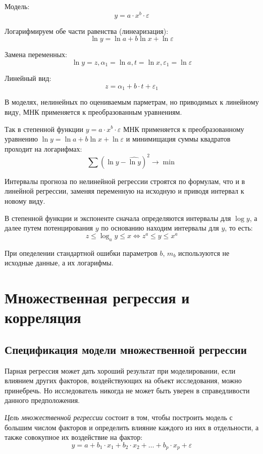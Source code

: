 \documentclass[aps,%
12pt,%
final,%
oneside,
onecolumn,%
musixtex, %
superscriptaddress,%
centertags]{article} %
\theoremstyle{plain}
\theoremstyle{definition}
\theoremstyle{remark}
\begin{document}
Модель:
$$ y = a \cdot x^b \cdot \varepsilon $$

Логарифмируем обе части равенства (линеаризация):
$$ \ln y =\ln a + b\ln x + \ln \varepsilon $$

Замена переменных:
$$ \ln y = z, \alpha_1 = \ln a, t = \ln x, \varepsilon_1 = \ln \varepsilon $$

Линейный вид:
$$ z =\alpha_1 + b \cdot t + \varepsilon_1 $$

В моделях, нелинейных по оцениваемым парметрам, но приводимых к линейному виду, МНК применяется к преобразованным уравнениям.

Так в степенной функции $y = a \cdot x^b \cdot \varepsilon$ МНК применяется к преобразованному уравнению $ \ln y =\ln a + b\ln x + \ln \varepsilon $ и минимищация суммы квадратов проходит на логарифмах:
$$\sum\limits (\ln y - \widehat{\ln y})^2 \to \min$$

Интервалы прогноза по нелинейной регрессии строятся по формулам, что и в линейной регрессии, заменяя переменную на исходную и приводя интервал к новому виду.

В степенной функции и экспоненте сначала определяются интервалы для $\log y$, а далее путем потенцирования $y$ по основанию находим интервалы для $y$, то есть:
$$z \leq \log_a y \leq x \Leftrightarrow z^a \leq y \leq x^a$$

При опеделении стандартной ошибки параметров $b$, $m_b$ используются не исходные данные, а их логарифмы.

\newpage

\section{Множественная регрессия и корреляция}

\subsection{Спецификация модели множественной регрессии}

Парная регрессия может дать хороший результат при моделировании, если влиянием других факторов, воздействующих на объект исследования, можно принебречь. Но исследователь никогда не может быть уверен в справедливости данного предположения.

\textit{Цель множественной регрессии} состоит в том, чтобы построить модель с большим числом факторов и определить влияние каждого из них в отдельности, а также совокупное их воздействие на фактор:
$$y = a + b_1\cdot x_1+b_2\cdot x_2 + \ldots + b_p\cdot x_p + \varepsilon$$
\end{document}
